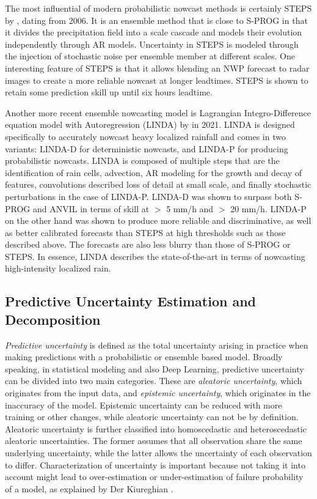 The most influential of modern probabilistic nowcast methods is certainly STEPS by \citet{bowler_steps_2006}, dating from 2006. It is an ensemble method that is close to S-PROG in that it divides the precipitation field into a scale cascade and models their evolution independently through AR models. Uncertainty in STEPS is modeled through the injection of stochastic noise per ensemble member at different scales. One interesting feature of STEPS is that it allows blending an NWP forecast to radar images to create a more reliable nowcast at longer leadtimes. STEPS is shown to retain some prediction skill up until six hours leadtime. 

Another more recent ensemble nowcasting model is Lagrangian Integro-Difference equation model with Autoregression (LINDA) by \citet{pulkkinen_lagrangian_2021} in 2021. LINDA is designed specifically to accurately nowcast heavy localized rainfall and comes in two variants: LINDA-D for deterministic nowcasts, and LINDA-P for producing probabilistic nowcasts. LINDA is composed of multiple steps that are the identification of rain cells, advection, AR modeling for the growth and decay of features, convolutions described loss of detail at small scale, and finally stochastic perturbations in the case of LINDA-P. LINDA-D was shown to surpass both S-PROG and ANVIL in terms of skill at  $>$ 5 mm/h and $>$ 20 mm/h. LINDA-P on the other hand was shown to produce more reliable and discriminative, as well as better calibrated forecasts than STEPS at high thresholds such as those described above. The forecasts are also less blurry than those of S-PROG or STEPS. In essence, LINDA describes the state-of-the-art in terms of nowcasting high-intensity localized rain. 


\subsection{Predictive Uncertainty Estimation and Decomposition}

\textit{Predictive uncertainty} is defined as the total uncertainty arising in practice when making predictions with a probabilistic or ensemble based model.
Broadly speaking, in statistical modeling and also Deep Learning, predictive uncertainty can be divided into two main categories. These are \textit{aleatoric uncertainty}, which originates from the input data, and \textit{epistemic uncertainty}, which originates in the inaccuracy of the model. Epistemic uncertainty can be reduced with more training or other changes, while aleatoric uncertainty can not be by definition. Aleatoric uncertainty is further classified into homoscedastic and heteroscedastic aleatoric uncertainties. The former assumes that all observation share the same underlying uncertainty, while the latter allows the uncertainty of each observation to differ. \cite{shridhar_comprehensive_2019} Characterization of uncertainty is important because not taking it into account might lead to over-estimation or under-estimation of failure probability of a model, as explained by Der Kiureghian \cite{kiureghian_aleatory_2009}. 


